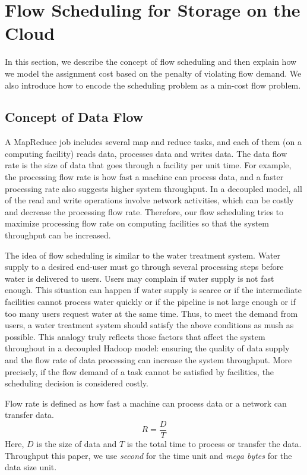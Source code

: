 \section{Flow Scheduling for Storage on the Cloud}
\label{sec:flow_scheduling}

In this section, we describe the concept of flow scheduling and then explain how we model the assignment cost based on the penalty of violating flow demand.
We also introduce how to encode the scheduling problem as a min-cost flow problem.

\subsection{Concept of Data Flow}
\label{sec:flow_rate}

A MapReduce job includes several map and reduce tasks, and each of them (on a computing facility) reads data, processes data and writes data.
The data flow rate is the size of data that goes through a facility per unit time.
For example, the processing flow rate is how fast a machine can process data, and a faster processing rate also suggests higher system throughput.
In a decoupled model, all of the read and write operations involve network activities, which can be costly and decrease the processing flow rate.
Therefore, our flow scheduling tries to maximize processing flow rate on computing facilities so that the system throughput can be increased.

The idea of flow scheduling is similar to the water treatment system.
Water supply to a desired end-user must go through several processing steps before water is delivered to users.
Users may complain if water supply is not fast enough.
This situation can happen if water supply is scarce or if the intermediate facilities cannot process water quickly or if the pipeline is not large enough or if too many users request water at the same time.
Thus, to meet the demand from users, a water treatment system should satisfy the above conditions as mush as possible.
This analogy truly reflects those factors that affect the system throughout in a decoupled Hadoop model: ensuring the quality of data supply and the flow rate of data processing can increase the system throughput.
More precisely, if the flow demand of a task cannot be satisfied by facilities, the scheduling decision is considered costly.

Flow rate is defined as how fast a machine can process data  or a network can transfer data.  
\begin{equation*} \label{eq:flow_rate}
R=\frac{D}{T}
\end{equation*}
Here, $D$ is the size of data and $T$ is the total time to process or transfer the data.
Throughput this paper, we use \textit{second} for the time unit and \textit{mega bytes} for the data size unit.

